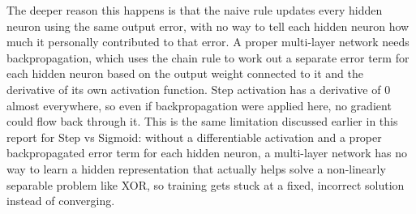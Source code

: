\documentclass[11pt]{article}
\begin{document}
The deeper reason this happens is that the naive rule updates every hidden neuron using the same
output error, with no way to tell each hidden neuron how much it personally contributed to that
error. A proper multi-layer network needs backpropagation, which uses the chain rule to work out a
separate error term for each hidden neuron based on the output weight connected to it and the
derivative of its own activation function. Step activation has a derivative of 0 almost everywhere,
so even if backpropagation were applied here, no gradient could flow back through it. This is the
same limitation discussed earlier in this report for Step vs Sigmoid: without a differentiable
activation and a proper backpropagated error term for each hidden neuron, a multi-layer network has
no way to learn a hidden representation that actually helps solve a non-linearly separable problem
like XOR, so training gets stuck at a fixed, incorrect solution instead of converging.
\end{document}
